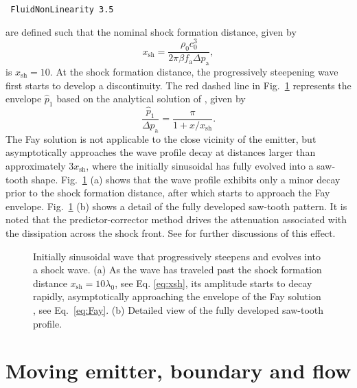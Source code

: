 {\tt
FluidNonLinearity 3.5
}

are defined such that the nominal shock formation distance, given by \citep{Blackstock_1966}
\begin{equation}
    x_{\mathrm{sh}} = \dfrac{\rho_0 c_0^3}{2\pi \beta f_{\mathrm{a}}\Delta p_{\mathrm{a}}},
    \label{eq:xsh}
\end{equation}
is $x_{\mathrm{sh}}=10$. At the shock formation distance, the progressively steepening wave first starts to develop a discontinuity. The red dashed line in Fig.~\ref{fig:shock_attenuation} represents the envelope $\widehat{p}_1$ based on the analytical solution of \citet{Fay_1931}, given by \citep{Blackstock_1966}
\begin{equation}
    \dfrac{\widehat{p}_1}{\Delta p_{\mathrm{a}}} = \dfrac{\pi}{1 + x/x_{\mathrm{sh}}}.
    \label{eq:Fay}
\end{equation}
The Fay solution is not applicable to the close vicinity of the emitter, but asymptotically approaches the wave profile decay at distances larger than approximately $3x_{\mathrm{sh}}$, where the initially sinusoidal has fully evolved into a saw-tooth shape. Fig.~\ref{fig:shock_attenuation} (a) shows that the wave profile exhibits only a minor decay prior to the shock formation distance, after which starts to approach the Fay envelope. Fig.~\ref{fig:shock_attenuation} (b) shows a detail of the fully developed saw-tooth pattern. It is noted that the predictor-corrector method drives the attenuation associated with the dissipation across the shock front. See \citep{Schenke_et_al_2022} for further discussions of this effect.

\begin{figure}
    \centering
    \caption{Initially sinusoidal wave that progressively steepens and evolves into a shock wave. (a) As the wave has traveled past the shock formation distance $x_{\mathrm{sh}}=10\lambda_0$, see Eq. \eqref{eq:xsh}, its amplitude starts to decay rapidly, asymptotically approaching the envelope of the Fay solution \citep{Fay_1931}, see Eq.~\eqref{eq:Fay}. (b) Detailed view of the fully developed saw-tooth profile.}
    \label{fig:shock_attenuation}
\end{figure}


\section{Moving emitter, boundary and flow}
\label{sec:Moving emitter, boundary and flow}

